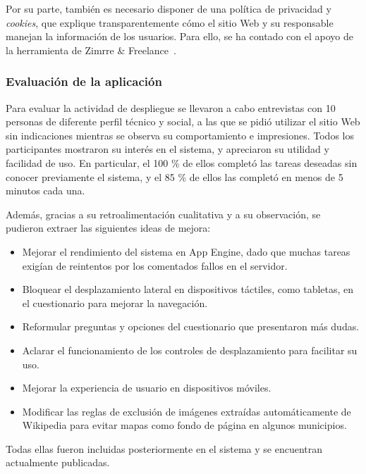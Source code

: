 Por su parte, también es necesario disponer de una política de privacidad y \textit{cookies}, que explique transparentemente cómo el sitio Web y su responsable manejan la información de los usuarios. Para ello, se ha contado con el apoyo de la herramienta de Zimrre \& Freelance~\cite{privacidad}.

\subsubsection{Evaluación de la aplicación}

Para evaluar la actividad de despliegue se llevaron a cabo entrevistas con 10 personas de diferente perfil técnico y social, a las que se pidió utilizar el sitio Web sin indicaciones mientras se observa su comportamiento e impresiones. Todos los participantes mostraron su interés en el sistema, y apreciaron su utilidad y facilidad de uso. En particular, el 100 \% de ellos completó las tareas deseadas sin conocer previamente el sistema, y el 85 \% de ellos las completó en menos de 5 minutos cada una.

Además, gracias a su retroalimentación cualitativa y a su observación, se pudieron extraer las siguientes ideas de mejora:

\begin{itemize}
    \item Mejorar el rendimiento del sistema en App Engine, dado que muchas tareas exigían de reintentos por los comentados fallos en el servidor.
    \item Bloquear el desplazamiento lateral en dispositivos táctiles, como tabletas, en el cuestionario para mejorar la navegación.
    \item Reformular preguntas y opciones del cuestionario que presentaron más dudas.
    \item Aclarar el funcionamiento de los controles de desplazamiento para facilitar su uso.
    \item Mejorar la experiencia de usuario en dispositivos móviles.
    \item Modificar las reglas de exclusión de imágenes extraídas automáticamente de Wikipedia para evitar mapas como fondo de página en algunos municipios.
\end{itemize}

Todas ellas fueron incluidas posteriormente en el sistema y se encuentran actualmente publicadas.
